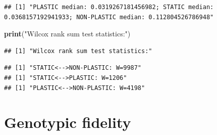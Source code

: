 \documentclass[]{book}
\newenvironment{Shaded}{\begin{snugshade}}{\end{snugshade}}
\newcommand{\ControlFlowTok}[1]{\textcolor[rgb]{0.13,0.29,0.53}{\textbf{#1}}}
\newcommand{\DataTypeTok}[1]{\textcolor[rgb]{0.13,0.29,0.53}{#1}}
\newcommand{\DecValTok}[1]{\textcolor[rgb]{0.00,0.00,0.81}{#1}}
\newcommand{\KeywordTok}[1]{\textcolor[rgb]{0.13,0.29,0.53}{\textbf{#1}}}
\newcommand{\NormalTok}[1]{#1}
\newcommand{\OperatorTok}[1]{\textcolor[rgb]{0.81,0.36,0.00}{\textbf{#1}}}
\newcommand{\OtherTok}[1]{\textcolor[rgb]{0.56,0.35,0.01}{#1}}
\newcommand{\StringTok}[1]{\textcolor[rgb]{0.31,0.60,0.02}{#1}}
\begin{document}
\begin{verbatim}
## [1] "PLASTIC median: 0.0319267181456982; STATIC median: 0.0368157192941933; NON-PLASTIC median: 0.112804526786948"
\end{verbatim}

\begin{Shaded}
\begin{Highlighting}[]
\KeywordTok{print}\NormalTok{(}\StringTok{"Wilcox rank sum test statistics:"}\NormalTok{)}
\end{Highlighting}
\end{Shaded}

\begin{verbatim}
## [1] "Wilcox rank sum test statistics:"
\end{verbatim}

\begin{Shaded}
\end{Shaded}

\begin{verbatim}
## [1] "STATIC<-->NON-PLASTIC: W=9987"
## [1] "STATIC<-->PLASTIC: W=1206"
## [1] "PLASTIC<-->NON-PLASTIC: W=4198"
\end{verbatim}

\hypertarget{genotypic-fidelity}{%
\section{Genotypic fidelity}\label{genotypic-fidelity}}
\end{document}
